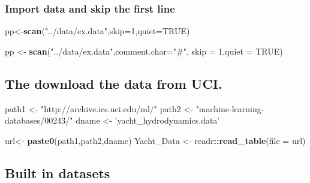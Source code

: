 \documentclass[10pt,]{article}
\newenvironment{Shaded}{\begin{snugshade}}{\end{snugshade}}
\newcommand{\KeywordTok}[1]{\textcolor[rgb]{0.13,0.29,0.53}{\textbf{#1}}}
\newcommand{\DataTypeTok}[1]{\textcolor[rgb]{0.13,0.29,0.53}{#1}}
\newcommand{\DecValTok}[1]{\textcolor[rgb]{0.00,0.00,0.81}{#1}}
\newcommand{\StringTok}[1]{\textcolor[rgb]{0.31,0.60,0.02}{#1}}
\newcommand{\OtherTok}[1]{\textcolor[rgb]{0.56,0.35,0.01}{#1}}
\newcommand{\OperatorTok}[1]{\textcolor[rgb]{0.81,0.36,0.00}{\textbf{#1}}}
\newcommand{\NormalTok}[1]{#1}
\begin{document}
\subsubsection{Import data and skip the first
line}\label{import-data-and-skip-the-first-line}

\begin{Shaded}
\begin{Highlighting}[]
\NormalTok{pp<-}\KeywordTok{scan}\NormalTok{(}\StringTok{"../data/ex.data"}\NormalTok{,}\DataTypeTok{skip=}\DecValTok{1}\NormalTok{,}\DataTypeTok{quiet=}\OtherTok{TRUE}\NormalTok{)}
\end{Highlighting}
\end{Shaded}

\begin{Shaded}
\begin{Highlighting}[]
\NormalTok{pp <-}\StringTok{ }\KeywordTok{scan}\NormalTok{(}\StringTok{"../data/ex.data"}\NormalTok{,}\DataTypeTok{comment.char=}\StringTok{"#"}\NormalTok{, }\DataTypeTok{skip =} \DecValTok{1}\NormalTok{,}\DataTypeTok{quiet =} \OtherTok{TRUE}\NormalTok{)}
\end{Highlighting}
\end{Shaded}

\subsection{The download the data from
UCI.}\label{the-download-the-data-from-uci.}

\begin{Shaded}
\begin{Highlighting}[]
\NormalTok{path1 <-}\StringTok{ "http://archive.ics.uci.edu/ml/"}
\NormalTok{path2 <-}\StringTok{ "machine-learning-databases/00243/"}
\NormalTok{dname <-}\StringTok{ 'yacht_hydrodynamics.data'}
\end{Highlighting}
\end{Shaded}

\begin{Shaded}
\begin{Highlighting}[]
\NormalTok{url<-}\StringTok{ }\KeywordTok{paste0}\NormalTok{(path1,path2,dname)}
\NormalTok{Yacht_Data <-}\StringTok{ }\NormalTok{readr}\OperatorTok{::}\KeywordTok{read_table}\NormalTok{(}\DataTypeTok{file =}\NormalTok{ url)}
\end{Highlighting}
\end{Shaded}

\subsection{Built in datasets}\label{built-in-datasets}
\end{document}
